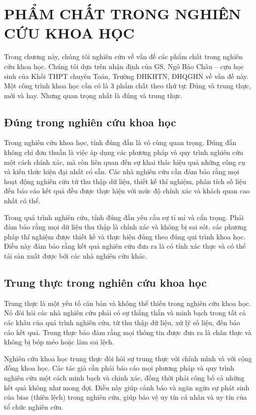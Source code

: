 \chapter{PHẨM CHẤT TRONG NGHIÊN CỨU KHOA HỌC}

Trong chương này, chúng tôi nghiên cứu về vấn đề các phẩm chất trong nghiên cứu khoa học. Chúng tôi dựa trên nhận định của GS. Ngô Bảo Châu – cựu học sinh của Khối THPT chuyên Toán, Trường ĐHKHTN, ĐHQGHN về vấn đề này. Một công trình khoa học cần có là 3 phẩm chất theo thứ tự: Đúng và trung thực, mới và hay. Nhưng quan trọng nhất là đúng và trung thực.

\section{Đúng trong nghiên cứu khoa học}

Trong nghiên cứu khoa học, tính đúng đắn là vô cùng quan trọng. Đúng đắn không chỉ đơn thuần là việc áp dụng các phương pháp và quy trình nghiên cứu một cách chính xác, mà còn liên quan đến sự khai thác hiệu quả những công cụ và kiến thức hiện đại nhất có sẵn. Các nhà nghiên cứu cần đảm bảo rằng mọi hoạt động nghiên cứu từ thu thập dữ liệu, thiết kế thí nghiệm, phân tích số liệu đến báo cáo kết quả đều được thực hiện với mức độ chính xác và khách quan cao nhất có thể.

Trong quá trình nghiên cứu, tính đúng đắn yêu cầu sự tỉ mỉ và cẩn trọng. Phải đảm bảo rằng mọi dữ liệu thu thập là chính xác và không bị sai sót, các phương pháp thí nghiệm được thiết kế và thực hiện đúng theo đúng qui trình khoa học. Điều này đảm bảo rằng kết quả nghiên cứu đưa ra là có tính xác thực và có thể tái sản xuất được bởi các nhà nghiên cứu khác.

\section{Trung thực trong nghiên cứu khoa học}

Trung thực là một yếu tố căn bản và không thể thiếu trong nghiên cứu khoa học. Nó đòi hỏi các nhà nghiên cứu phải có sự thẳng thắn và minh bạch trong tất cả các khâu của quá trình nghiên cứu, từ thu thập dữ liệu, xử lý số liệu, đến báo cáo kết quả. Trung thực bảo đảm rằng mọi thông tin được đưa ra là chân thực và không bị bóp méo hoặc làm sai lệch.

Nghiên cứu khoa học trung thực đòi hỏi sự trung thực với chính mình và với cộng đồng khoa học. Các tác giả cần phải báo cáo mọi phương pháp và quy trình nghiên cứu một cách minh bạch và chính xác, đồng thời phải công bố cả những kết quả không như mong đợi. Điều này giúp cảnh báo và ngăn ngừa sự phát sinh của bias (thiên lệch) trong nghiên cứu, giúp bảo vệ uy tín cá nhân và uy tín của tổ chức nghiên cứu.

